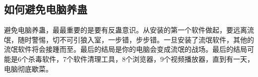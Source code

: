 \documentclass[../../../dolphin-book-2023.tex]{subfiles}
\begin{document}
\subsection{如何避免电脑养蛊}

避免电脑养蛊，最最重要的是要有反蛊意识。从安装的第一个软件做起，要远离流氓，随时警惕，切不可引狼入室，一步错，步步错。一旦安装了流氓软件，其他的流氓软件将会接踵而至。最后的结局是你的电脑会变成流氓的战场。最后的结局可能是6个杀毒软件，7个软件清理工具，8个浏览器，9个视频播放器，直到有一天，电脑彻底歇菜。
\end{document}
